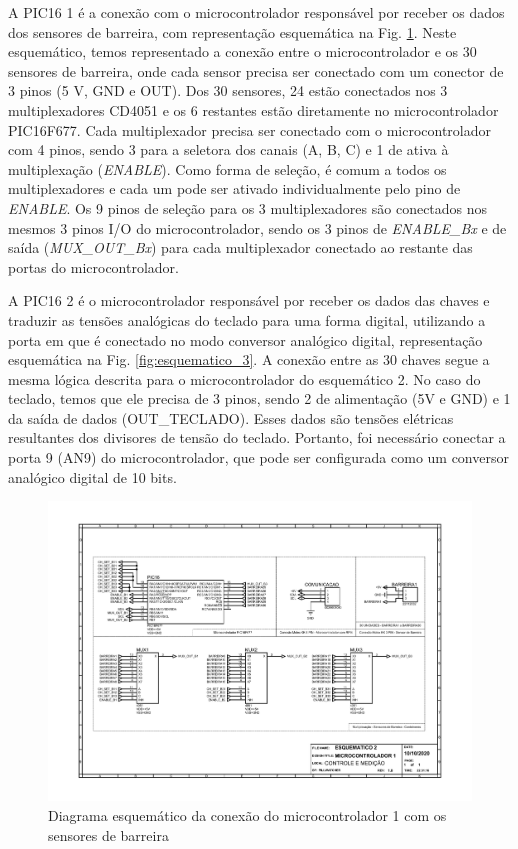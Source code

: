 \begin{apendicesenv}
A PIC16 1 é a conexão com o microcontrolador  responsável por receber os dados dos sensores de barreira, com representação esquemática na Fig. \ref{fig:esquematico_2}. Neste esquemático, temos representado a conexão entre o microcontrolador e os 30 sensores de barreira, onde cada sensor precisa ser conectado com um conector de 3 pinos (5 V, GND e OUT). Dos 30 sensores, 24 estão conectados nos 3 multiplexadores CD4051 e os 6 restantes estão diretamente no microcontrolador PIC16F677. Cada multiplexador precisa ser conectado com o microcontrolador com 4 pinos, sendo 3 para a seletora dos canais (A, B, C) e 1 de ativa à multiplexação (\textit{ENABLE}). Como forma de seleção, é comum a todos os multiplexadores e cada um pode ser ativado  individualmente pelo pino de \textit{ENABLE}. Os 9 pinos de seleção para os 3 multiplexadores são conectados nos mesmos 3 pinos I/O do microcontrolador, sendo os 3 pinos de \textit{ENABLE\_Bx} e de saída (\textit{MUX\_OUT\_Bx}) para cada multiplexador conectado ao restante das portas do microcontrolador.

A PIC16 2 é o microcontrolador responsável por receber os dados das chaves e traduzir as tensões analógicas do teclado para uma forma digital, utilizando a porta em que é conectado no modo conversor analógico digital, representação esquemática na Fig. \ref{fig:esquematico_3}. A conexão entre as 30 chaves segue a mesma lógica descrita para o microcontrolador do esquemático 2. No caso do teclado, temos que ele precisa de 3 pinos, sendo 2 de alimentação (5V e GND) e 1 da saída de dados (OUT\_TECLADO). Esses dados são tensões elétricas resultantes dos divisores de tensão do teclado. Portanto, foi necessário conectar a porta 9 (AN9) do microcontrolador, que pode ser configurada como um conversor analógico digital de 10 bits.


\begin{landscape}
\begin{figure}[H]
    \centering
    \includegraphics[width=1.25\textwidth, height=2\textheight,keepaspectratio]{figuras/eletronica/esquematicos/esquematico_2_micro1.pdf}
    \caption{Diagrama esquemático da conexão do microcontrolador 1 com os sensores de barreira}
    \label{fig:esquematico_2}
\end{figure}
\end{landscape}


\end{apendicesenv}
